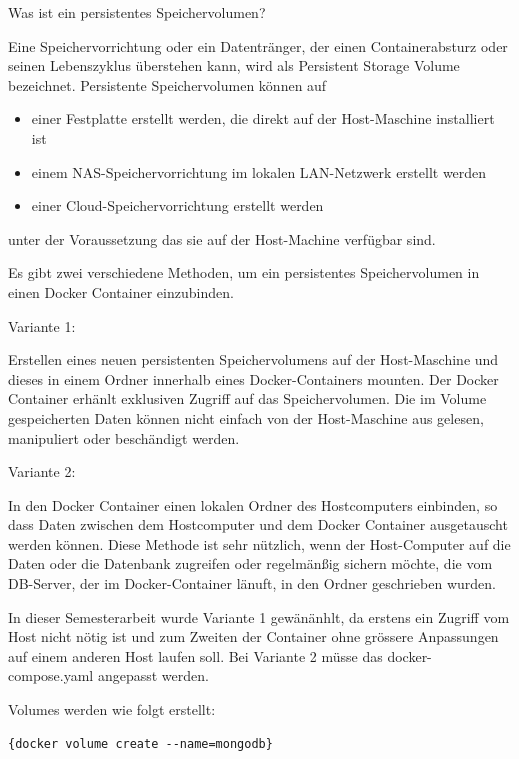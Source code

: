 Was ist ein persistentes Speichervolumen?

Eine Speichervorrichtung oder ein Datentr{\"a}nger, der einen Containerabsturz oder seinen Lebenszyklus {\"u}berstehen kann, wird als Persistent Storage Volume bezeichnet. Persistente Speichervolumen k{\"o}nnen auf
\begin{itemize}
  \item einer Festplatte erstellt werden, die direkt auf der Host-Maschine installiert ist 
  \item einem NAS-Speichervorrichtung im lokalen LAN-Netzwerk erstellt werden
  \item einer Cloud-Speichervorrichtung erstellt werden
\end{itemize}
unter der Voraussetzung das sie auf der Host-Machine verf{\"u}gbar sind.

Es gibt zwei verschiedene Methoden, um ein persistentes Speichervolumen in einen Docker Container einzubinden.

Variante 1:

Erstellen eines neuen persistenten Speichervolumens auf der Host-Maschine und dieses in einem Ordner innerhalb eines Docker-Containers mounten. Der Docker Container erh{\"a}nlt exklusiven Zugriff auf das Speichervolumen. Die im Volume gespeicherten Daten k{\"o}nnen nicht einfach von der Host-Maschine aus gelesen, manipuliert oder besch{\"a}ndigt werden.
  
Variante 2:

In den Docker Container einen lokalen Ordner des Hostcomputers einbinden, so dass Daten zwischen dem Hostcomputer und dem Docker Container ausgetauscht werden k{\"o}nnen. Diese Methode ist sehr n{\"u}tzlich, wenn der Host-Computer auf die Daten oder die Datenbank zugreifen oder regelm{\"a}nßig sichern m{\"o}chte, die vom DB-Server, der im Docker-Container l{\"a}nuft, in den Ordner geschrieben wurden.

In dieser Semesterarbeit wurde Variante 1 gew{\"a}n{\"a}nhlt, da erstens ein Zugriff vom Host nicht n{\"o}tig ist und zum Zweiten der Container ohne gr{\"o}ssere Anpassungen auf einem anderen Host laufen soll. Bei Variante 2 m{\"u}sse das docker-compose.yaml angepasst werden.

Volumes werden wie folgt erstellt:

\begin{lstlisting}[float=h,frame=tb,caption={Befehl zum Volume erstellen},label=lst:erstelle_volume]
		{docker volume create --name=mongodb}
\end{lstlisting}  

